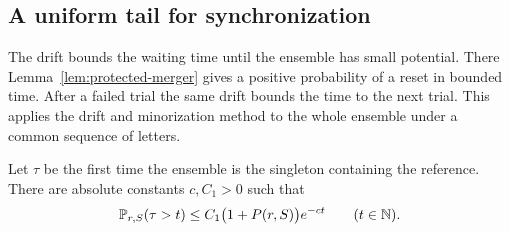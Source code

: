\subsection{A uniform tail for synchronization}

The drift bounds the waiting time until the ensemble has small potential.
There Lemma~\ref{lem:protected-merger} gives a positive probability of
a reset in bounded time. After a failed trial the same drift bounds the
time to the next trial. This applies the drift and minorization method
\cite[Theorem~12]{rosenthal-1995} to the whole ensemble under a common
sequence of letters.

\begin{lemma}\label{lem:sync-tail}
Let $\tau$ be the first time the ensemble is the singleton containing
the reference. There are absolute constants $c,C_1>0$ such that
\begin{equation}\label{eq:sync-tail}
 \mathbb P_{r,S}(\tau>t)
 \le C_1\bigl(1+P(r,S)\bigr)e^{-ct}
 \qquad(t\in\mathbb N).
\end{equation}
\end{lemma}
